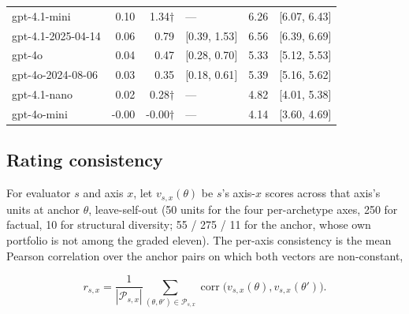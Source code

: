 \documentclass{article}
\begin{document}
\begin{table}[H]
\begin{center}
{\begin{tabular}{@{}lrrlrl@{}}
gpt-4.1-mini &\cellcolor[HTML]{F1F9B9}\textcolor[HTML]{1A1A1A}{0.10}&\cellcolor[HTML]{EAF7B1}\textcolor[HTML]{1A1A1A}{1.34\ensuremath{\dagger}}& --- &\cellcolor[HTML]{1D91C0}\textcolor[HTML]{EEF3F8}{6.26}& {[}6.07, 6.43{]}  \\
gpt-4.1-2025-04-14 &\cellcolor[HTML]{F6FCC6}\textcolor[HTML]{1A1A1A}{0.06}&\cellcolor[HTML]{F4FBC0}\textcolor[HTML]{1A1A1A}{0.79}& {[}0.39, 1.53{]} &\cellcolor[HTML]{1E84BA}\textcolor[HTML]{EEF3F8}{6.56}& {[}6.39, 6.69{]}  \\
gpt-4o &\cellcolor[HTML]{F9FDCC}\textcolor[HTML]{1A1A1A}{0.04}&\cellcolor[HTML]{F8FCCA}\textcolor[HTML]{1A1A1A}{0.47}& {[}0.28, 0.70{]} &\cellcolor[HTML]{37ACC3}\textcolor[HTML]{EEF3F8}{5.33}& {[}5.12, 5.53{]}  \\
gpt-4o-2024-08-06 &\cellcolor[HTML]{FBFDCF}\textcolor[HTML]{1A1A1A}{0.03}&\cellcolor[HTML]{FAFDCE}\textcolor[HTML]{1A1A1A}{0.35}& {[}0.18, 0.61{]} &\cellcolor[HTML]{36AAC3}\textcolor[HTML]{EEF3F8}{5.39}& {[}5.16, 5.62{]}  \\
gpt-4.1-nano &\cellcolor[HTML]{FCFED3}\textcolor[HTML]{1A1A1A}{0.02}&\cellcolor[HTML]{FBFDD0}\textcolor[HTML]{1A1A1A}{0.28\ensuremath{\dagger}}& --- &\cellcolor[HTML]{4AB9C3}\textcolor[HTML]{1A1A1A}{4.82}& {[}4.01, 5.38{]}  \\
gpt-4o-mini &\cellcolor[HTML]{FFFFD9}\textcolor[HTML]{1A1A1A}{-0.00}&\cellcolor[HTML]{FFFFD9}\textcolor[HTML]{1A1A1A}{-0.00\ensuremath{\dagger}}& --- &\cellcolor[HTML]{6CC6BE}\textcolor[HTML]{1A1A1A}{4.14}& {[}3.60, 4.69{]}  \\
\bottomrule
\end{tabular}}
\end{center}
\end{table}

\subsection{Rating consistency}\label{rating-consistency}

For evaluator \(s\) and axis \(x\), let \(v_{s,x}(\theta)\) be \(s\)'s axis-\(x\) scores across that axis's units at anchor \(\theta\), leave-self-out (50 units for the four per-archetype axes, 250 for factual, 10 for structural diversity; 55 / 275 / 11 for the anchor, whose own portfolio is not among the graded eleven). The per-axis consistency is the mean Pearson correlation over the anchor pairs on which both vectors are non-constant,

\[ r_{s,x}=\frac{1}{|\mathcal P_{s,x}|}\sum_{(\theta,\theta')\in\mathcal P_{s,x}}\operatorname{corr}\!\big(v_{s,x}(\theta),v_{s,x}(\theta')\big). \tag{A10}\]
\end{document}
